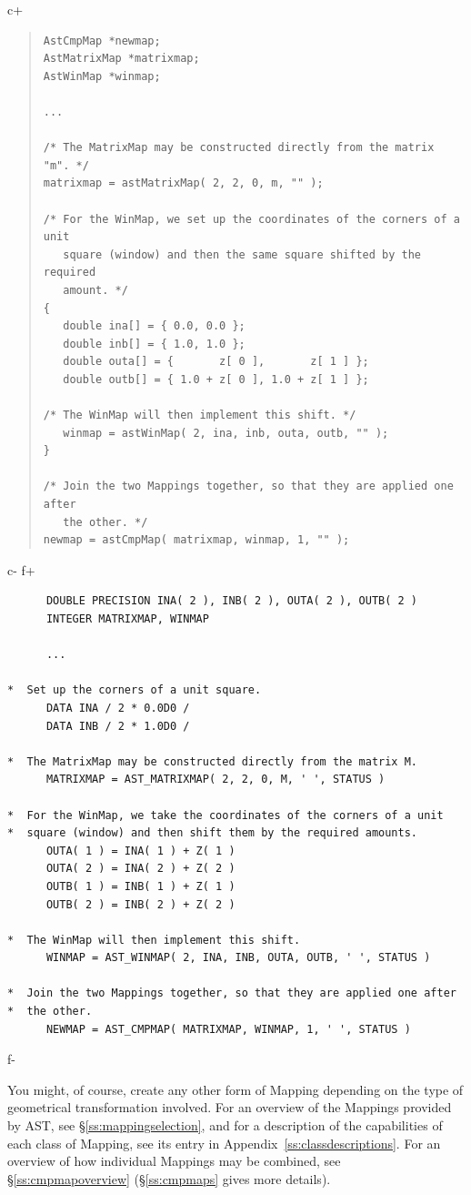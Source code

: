 \documentclass[twoside,11pt]{article}
\newcommand{\appref}[1]{Appendix~\ref{#1}}
\newcommand{\secref}[1]{\S\ref{#1}}
\newcommand{\appref}[1]{\ref{#1}}
\newcommand{\secref}[1]{\ref{#1}}
\begin{document}
c+
\begin{quote}
\small
\begin{verbatim}
AstCmpMap *newmap;
AstMatrixMap *matrixmap;
AstWinMap *winmap;

...

/* The MatrixMap may be constructed directly from the matrix "m". */
matrixmap = astMatrixMap( 2, 2, 0, m, "" );

/* For the WinMap, we set up the coordinates of the corners of a unit
   square (window) and then the same square shifted by the required
   amount. */
{
   double ina[] = { 0.0, 0.0 };
   double inb[] = { 1.0, 1.0 };
   double outa[] = {       z[ 0 ],       z[ 1 ] };
   double outb[] = { 1.0 + z[ 0 ], 1.0 + z[ 1 ] };

/* The WinMap will then implement this shift. */
   winmap = astWinMap( 2, ina, inb, outa, outb, "" );
}

/* Join the two Mappings together, so that they are applied one after
   the other. */
newmap = astCmpMap( matrixmap, winmap, 1, "" );
\end{verbatim}
\normalsize
\end{quote}
c-
f+
\small
\begin{verbatim}
      DOUBLE PRECISION INA( 2 ), INB( 2 ), OUTA( 2 ), OUTB( 2 )
      INTEGER MATRIXMAP, WINMAP

      ...

*  Set up the corners of a unit square.
      DATA INA / 2 * 0.0D0 /
      DATA INB / 2 * 1.0D0 /

*  The MatrixMap may be constructed directly from the matrix M.
      MATRIXMAP = AST_MATRIXMAP( 2, 2, 0, M, ' ', STATUS )

*  For the WinMap, we take the coordinates of the corners of a unit
*  square (window) and then shift them by the required amounts.
      OUTA( 1 ) = INA( 1 ) + Z( 1 )
      OUTA( 2 ) = INA( 2 ) + Z( 2 )
      OUTB( 1 ) = INB( 1 ) + Z( 1 )
      OUTB( 2 ) = INB( 2 ) + Z( 2 )

*  The WinMap will then implement this shift.
      WINMAP = AST_WINMAP( 2, INA, INB, OUTA, OUTB, ' ', STATUS )

*  Join the two Mappings together, so that they are applied one after
*  the other.
      NEWMAP = AST_CMPMAP( MATRIXMAP, WINMAP, 1, ' ', STATUS )
\end{verbatim}
\normalsize
f-

You might, of course, create any other form of Mapping depending on
the type of geometrical transformation involved. For an overview of
the Mappings provided by AST, see \secref{ss:mappingselection}, and
for a description of the capabilities of each class of Mapping, see
its entry in \appref{ss:classdescriptions}. For an overview of how
individual Mappings may be combined, see \secref{ss:cmpmapoverview}
(\secref{ss:cmpmaps} gives more details).
\end{document}
